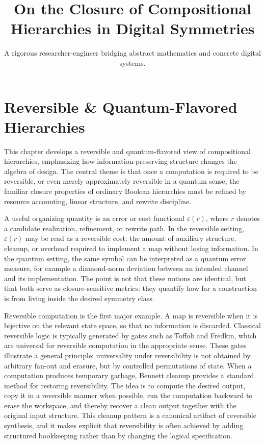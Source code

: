 \documentclass[11pt]{article}
\title{On the Closure of Compositional Hierarchies in Digital Symmetries}
\author{A rigorous researcher-engineer bridging abstract mathematics and concrete digital systems.}
\begin{document}
\section*{Reversible \& Quantum-Flavored Hierarchies}

This chapter develops a reversible and quantum-flavored view of compositional hierarchies, emphasizing how information-preserving structure changes the algebra of design. The central theme is that once a computation is required to be reversible, or even merely approximately reversible in a quantum sense, the familiar closure properties of ordinary Boolean hierarchies must be refined by resource accounting, linear structure, and rewrite discipline.

A useful organizing quantity is an error or cost functional \(\varepsilon(r)\), where \(r\) denotes a candidate realization, refinement, or rewrite path. In the reversible setting, \(\varepsilon(r)\) may be read as a reversible cost: the amount of auxiliary structure, cleanup, or overhead required to implement a map without losing information. In the quantum setting, the same symbol can be interpreted as a quantum error measure, for example a diamond-norm deviation between an intended channel and its implementation. The point is not that these notions are identical, but that both serve as closure-sensitive metrics: they quantify how far a construction is from living inside the desired symmetry class.

Reversible computation is the first major example. A map is reversible when it is bijective on the relevant state space, so that no information is discarded. Classical reversible logic is typically generated by gates such as Toffoli and Fredkin, which are universal for reversible computation in the appropriate sense. These gates illustrate a general principle: universality under reversibility is not obtained by arbitrary fan-out and erasure, but by controlled permutations of state. When a computation produces temporary garbage, Bennett cleanup provides a standard method for restoring reversibility. The idea is to compute the desired output, copy it in a reversible manner when possible, run the computation backward to erase the workspace, and thereby recover a clean output together with the original input structure. This cleanup pattern is a canonical artifact of reversible synthesis, and it makes explicit that reversibility is often achieved by adding structured bookkeeping rather than by changing the logical specification.
\end{document}
